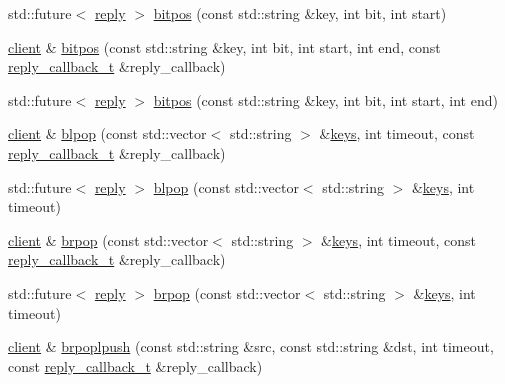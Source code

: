 \begin{DoxyCompactItemize}
\item 
std\+::future$<$ \hyperlink{classcpp__redis_1_1reply}{reply} $>$ \hyperlink{classcpp__redis_1_1client_aa0ae004e45eb37ffed4d8c9f5ea35b4c}{bitpos} (const std\+::string \&key, int bit, int start)
\item 
\hyperlink{classcpp__redis_1_1client}{client} \& \hyperlink{classcpp__redis_1_1client_a3655449a666a9111d3dce7e61932ab1b}{bitpos} (const std\+::string \&key, int bit, int start, int end, const \hyperlink{classcpp__redis_1_1client_a061a1140d36d2eaeda82b09a0bb3f9f2}{reply\+\_\+callback\+\_\+t} \&reply\+\_\+callback)
\item 
std\+::future$<$ \hyperlink{classcpp__redis_1_1reply}{reply} $>$ \hyperlink{classcpp__redis_1_1client_a43b5121105276ccae731bb6093c80e02}{bitpos} (const std\+::string \&key, int bit, int start, int end)
\item 
\hyperlink{classcpp__redis_1_1client}{client} \& \hyperlink{classcpp__redis_1_1client_a432c2677b13dc8e2a9d7afe7eade39e3}{blpop} (const std\+::vector$<$ std\+::string $>$ \&\hyperlink{classcpp__redis_1_1client_acb7845a206b2321e6919c2f38282c322}{keys}, int timeout, const \hyperlink{classcpp__redis_1_1client_a061a1140d36d2eaeda82b09a0bb3f9f2}{reply\+\_\+callback\+\_\+t} \&reply\+\_\+callback)
\item 
std\+::future$<$ \hyperlink{classcpp__redis_1_1reply}{reply} $>$ \hyperlink{classcpp__redis_1_1client_ac54c987bca4efb4bf6659b063f19d5ff}{blpop} (const std\+::vector$<$ std\+::string $>$ \&\hyperlink{classcpp__redis_1_1client_acb7845a206b2321e6919c2f38282c322}{keys}, int timeout)
\item 
\hyperlink{classcpp__redis_1_1client}{client} \& \hyperlink{classcpp__redis_1_1client_adc565332168e31ebbd762f2cb12ad4d1}{brpop} (const std\+::vector$<$ std\+::string $>$ \&\hyperlink{classcpp__redis_1_1client_acb7845a206b2321e6919c2f38282c322}{keys}, int timeout, const \hyperlink{classcpp__redis_1_1client_a061a1140d36d2eaeda82b09a0bb3f9f2}{reply\+\_\+callback\+\_\+t} \&reply\+\_\+callback)
\item 
std\+::future$<$ \hyperlink{classcpp__redis_1_1reply}{reply} $>$ \hyperlink{classcpp__redis_1_1client_aa123b931c6d00027d08f0fcbde2f026e}{brpop} (const std\+::vector$<$ std\+::string $>$ \&\hyperlink{classcpp__redis_1_1client_acb7845a206b2321e6919c2f38282c322}{keys}, int timeout)
\item 
\hyperlink{classcpp__redis_1_1client}{client} \& \hyperlink{classcpp__redis_1_1client_afa7fb97bb0b30c2c78a605f48b6144e2}{brpoplpush} (const std\+::string \&src, const std\+::string \&dst, int timeout, const \hyperlink{classcpp__redis_1_1client_a061a1140d36d2eaeda82b09a0bb3f9f2}{reply\+\_\+callback\+\_\+t} \&reply\+\_\+callback)

\end{DoxyCompactItemize}
